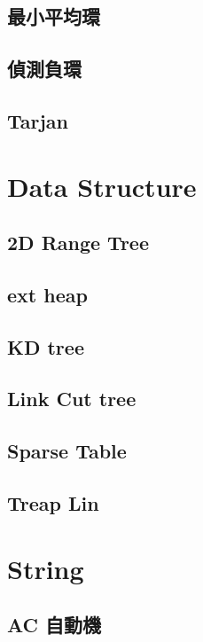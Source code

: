 \subsection{最小平均環}

\subsection{偵測負環}

\subsection{Tarjan}


\section{Data Structure}

\subsection{2D Range Tree}

\subsection{ext heap}

\subsection{KD tree}

\subsection{Link Cut tree}

\subsection{Sparse Table}

\subsection{Treap Lin}



\section{String}

\subsection{AC 自動機}

